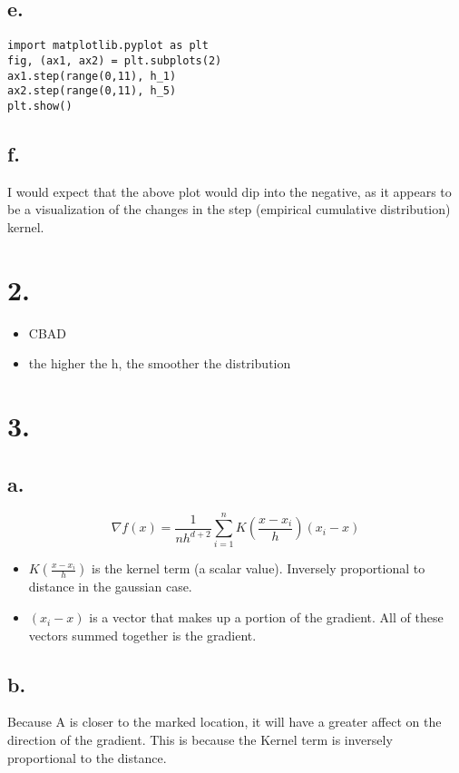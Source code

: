 \documentclass[11pt]{article}
\begin{document}
\subsection*{e.}
\label{sec:orgfb03943}
\begin{verbatim}
import matplotlib.pyplot as plt
fig, (ax1, ax2) = plt.subplots(2)
ax1.step(range(0,11), h_1)
ax2.step(range(0,11), h_5)
plt.show()
\end{verbatim}
\subsection*{f.}
\label{sec:org442121b}
I would expect that the above plot would dip into the negative, as it appears to
be a visualization of the changes in the step (empirical cumulative
distribution) kernel.
\section*{2.}
\label{sec:org8e844d1}
\begin{itemize}
\item CBAD
\item the higher the h, the smoother the distribution
\end{itemize}
\section*{3.}
\label{sec:orgdd8b558}
\subsection*{a.}
\label{sec:org95cba48}
\begin{equation*}
\nabla f(x) = \frac{1}{nh^{d+2}}\sum \limits^n_{i=1}K\left(\frac{x-x_i}{h}\right)(x_i-x)
\end{equation*}

\begin{itemize}
\item \(K(\frac{x-x_i}{h})\) is the kernel term (a scalar value). Inversely
proportional to distance in the gaussian case.
\item \((x_i-x)\) is a vector that makes up a portion of the gradient. All of these
vectors summed together is the gradient.
\end{itemize}
\subsection*{b.}
\label{sec:org8f663c0}
Because A is closer to the marked location, it will have a greater affect on the
direction of the gradient. This is because the Kernel term is inversely
proportional to the distance.
\end{document}
